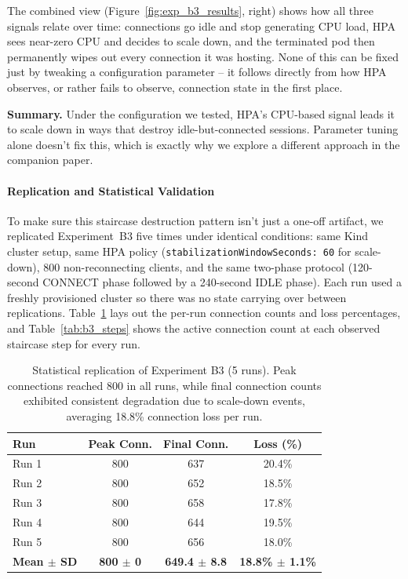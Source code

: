\documentclass[pdflatex,sn-mathphys-num]{sn-jnl}
\theoremstyle{thmstyleone}%
\theoremstyle{thmstyletwo}%
\theoremstyle{thmstylethree}%
\begin{document}
The combined view (Figure~\ref{fig:exp_b3_results}, right) shows how all three
signals relate over time: connections go idle and stop generating CPU load, HPA
sees near-zero CPU and decides to scale down, and the terminated pod then
permanently wipes out every connection it was hosting. None of this can be fixed
just by tweaking a configuration parameter -- it follows directly from how HPA
observes, or rather fails to observe, connection state in the first place.

\noindent\textbf{Summary.} Under the configuration we tested, HPA's CPU-based
signal leads it to scale down in ways that destroy idle-but-connected sessions.
Parameter tuning alone doesn't fix this, which is exactly why we explore a
different approach in the companion paper.

\paragraph{Replication and Statistical Validation}
To make sure this staircase destruction pattern isn't just a one-off artifact, we
replicated Experiment~B3 five times under identical conditions: same Kind cluster
setup, same HPA policy (\texttt{stabilizationWindowSeconds: 60} for scale-down),
800 non-reconnecting clients, and the same two-phase protocol (120-second CONNECT
phase followed by a 240-second IDLE phase). Each run used a freshly provisioned
cluster so there was no state carrying over between replications.
Table~\ref{tab:b3_replication} lays out the per-run connection counts and loss
percentages, and Table~\ref{tab:b3_steps} shows the active connection count at
each observed staircase step for every run.

\begin{table}[htbp]
\centering
\caption{Statistical replication of Experiment B3 (5 runs). Peak connections reached
800 in all runs, while final connection counts exhibited consistent degradation due to
scale-down events, averaging 18.8\% connection loss per run.}
\label{tab:b3_replication}
\begin{tabular*}{\textwidth}{@{\extracolsep{\fill}}lccc@{}}
\toprule
\textbf{Run} & \textbf{Peak Conn.} & \textbf{Final Conn.} & \textbf{Loss (\%)} \\
\midrule
Run 1 & 800 & 637 & 20.4\% \\
Run 2 & 800 & 652 & 18.5\% \\
Run 3 & 800 & 658 & 17.8\% \\
Run 4 & 800 & 644 & 19.5\% \\
Run 5 & 800 & 656 & 18.0\% \\
\midrule
\textbf{Mean $\pm$ SD} & \textbf{800 $\pm$ 0} & \textbf{649.4 $\pm$ 8.8} & \textbf{18.8\% $\pm$ 1.1\%} \\
\bottomrule
\end{tabular*}
\end{table}
\end{document}
